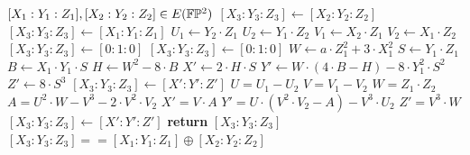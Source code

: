 \begin{algorithm}\caption{Projective  Addition Law}
\label{alg:projective_group_law}
\begin{algorithmic}[0]
\Require $[X_1:Y_1:Z_1],[X_2:Y_2:Z_2] \in E(\mathbb{F}\mathbb{P}^2)$
\If{$[X_1:Y_1:Z_1] == [0:1:0]$}
  \State $[X_3:Y_3:Z_3] \gets [X_2:Y_2:Z_2]$
\ElsIf{$[X_2:Y_2:Z_2] == [0:1:0]$}
  \State $[X_3:Y_3:Z_3] \gets [X_1:Y_1:Z_1]$
\Else
  \State $U_1 \gets Y_2\cdot Z_1$
  \State $U_2 \gets Y_1\cdot Z_2$
  \State $V_1 \gets X_2\cdot Z_1$
  \State $V_2 \gets X_1\cdot Z_2$
      $[X_3:Y_3:Z_3] \gets [0:1:0]$
    \Else
        $[X_3:Y_3:Z_3] \gets [0:1:0]$
      \Else
        \State $W \gets a\cdot Z_1^2 + 3\cdot X_1^2$
        \State $S \gets Y_1\cdot Z_1$
        \State $B \gets X_1\cdot Y_1\cdot S$
        \State $H \gets W^2 - 8\cdot B$
        \State $X' \gets 2\cdot H\cdot S$
        \State $Y' \gets W\cdot (4\cdot B - H) - 8\cdot Y_1^2\cdot S^2$
        \State $Z' \gets 8\cdot S^3$
        \State $[X_3:Y_3:Z_3] \gets [X':Y':Z']$
      \EndIf
    \EndIf
  \Else
    \State $U = U_1 - U_2$
    \State $V = V_1 - V_2$
    \State $W = Z_1\cdot Z_2$
    \State $A = U^2\cdot W - V^3 - 2\cdot V^2\cdot V_2$
    \State $X' = V\cdot A$
    \State $Y' = U\cdot(V^2\cdot V_2 - A) - V^3\cdot U_2$
    \State $Z' = V^3\cdot W$
    \State $[X_3:Y_3:Z_3]\gets [X':Y':Z']$
  \EndIf
\EndIf
\State \textbf{return} $[X_3:Y_3:Z_3]$
\EndProcedure
\Ensure $ [X_3:Y_3:Z_3] == [X_1:Y_1:Z_1] \oplus [X_2:Y_2:Z_2]$
\end{algorithmic}
\end{algorithm}


